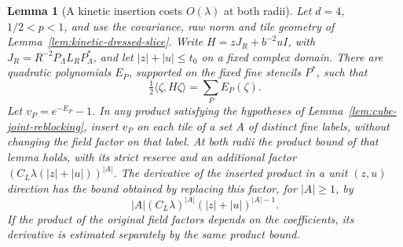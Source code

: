\documentclass[11pt]{article}
\newtheorem{lemma}[theorem]{Lemma}
\theoremstyle{definition}
\begin{document}
\begin{lemma}[A kinetic insertion costs \(O(\lambda)\) at both radii]
\label{lem:cube-kinetic-density}
Let \(d=4\), \(1/2<p<1\), and use the covariance, raw norm and
tile geometry of Lemma~\ref{lem:kinetic-dressed-slice}. Write
\(H=zJ_R+b^{-2}uI\), with \(J_R=R^{-2}P_\Lambda L_RP_\Lambda^*\),
and let \(|z|+|u|\le t_0\) on a fixed complex domain. There are
quadratic polynomials \(E_P\), supported on the fixed fine stencils
\(P^*\), such that
\begin{equation}
 \tfrac12\langle\zeta,H\zeta\rangle=\sum_P E_P(\zeta).
\end{equation}
Let \(v_P=e^{-E_P}-1\). In any product satisfying the hypotheses
of Lemma~\ref{lem:cube-joint-reblocking}, insert \(v_P\) on each
tile of a set \(A\) of distinct fine labels, without changing the
field factor on that label. At both radii the product bound of
that lemma holds, with its strict reserve and an additional factor
\((C_L\lambda (|z|+|u|))^{|A|}\). The derivative of the inserted
product in a unit \((z,u)\) direction has the bound obtained
by replacing this factor, for \(|A|\ge1\), by
\begin{equation}
 |A|(C_L\lambda)^{|A|}(|z|+|u|)^{|A|-1}.
\end{equation}
If the product of the original field factors depends on the
coefficients, its derivative is estimated separately by the
same product bound.
\end{lemma}
\end{document}
